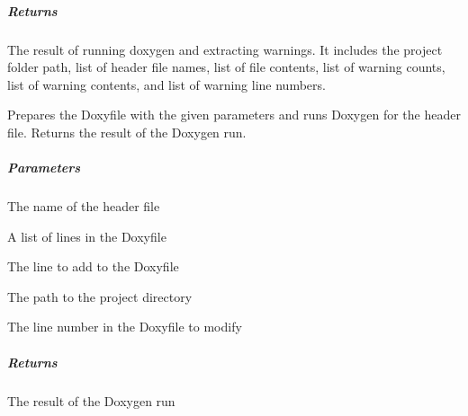 \documentclass[letterpaper,10pt,english]{sphinxmanual}
\begin{document}
\begin{fulllineitems}
\begin{fulllineitems}
\subparagraph{Returns}
\label{\detokenize{main.doxygen_management:id4}}\begin{description}
\sphinxAtStartPar
The result of running doxygen and extracting warnings. It includes the project folder path,
list of header file names, list of file contents, list of warning counts,
list of warning contents, and list of warning line numbers.

\end{description}

\end{fulllineitems}


\begin{fulllineitems}
\label{\detokenize{main.doxygen_management:main.doxygen_management.doxy_warning_detector.DoxyWarningDetector.run_doxygen_for_file}}
\pysigstartsignatures
{}
\pysigstopsignatures
\sphinxAtStartPar
Prepares the Doxyfile with the given parameters and runs Doxygen for the header file.
Returns the result of the Doxygen run.


\subparagraph{Parameters}
\label{\detokenize{main.doxygen_management:id5}}\begin{description}
\sphinxAtStartPar
The name of the header file

\sphinxAtStartPar
A list of lines in the Doxyfile

\sphinxAtStartPar
The line to add to the Doxyfile

\sphinxAtStartPar
The path to the project directory

\sphinxAtStartPar
The line number in the Doxyfile to modify

\end{description}


\subparagraph{Returns}
\label{\detokenize{main.doxygen_management:id6}}\begin{description}
\sphinxAtStartPar
The result of the Doxygen run

\end{description}

\end{fulllineitems}


\end{fulllineitems}
\end{document}
